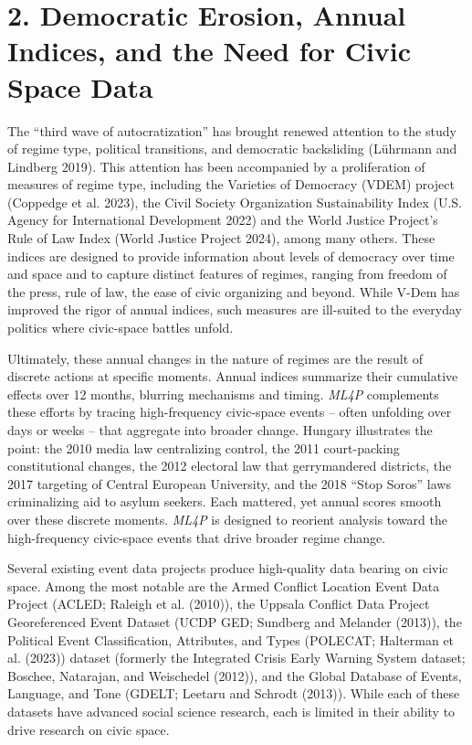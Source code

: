 \documentclass[
  letterpaper,
  DIV=11,
  numbers=noendperiod]{scrartcl}
\begin{document}
\hypertarget{sec-background}{%
\section{2. Democratic Erosion, Annual Indices, and the Need for Civic
Space Data}\label{sec-background}}

The ``third wave of autocratization'' has brought renewed attention to
the study of regime type, political transitions, and democratic
backsliding (Lührmann and Lindberg 2019). This attention has been
accompanied by a proliferation of measures of regime type, including the
Varieties of Democracy (VDEM) project (Coppedge et al. 2023), the Civil
Society Organization Sustainability Index (U.S. Agency for International
Development 2022) and the World Justice Project's Rule of Law Index
(World Justice Project 2024), among many others. These indices are
designed to provide information about levels of democracy over time and
space and to capture distinct features of regimes, ranging from freedom
of the press, rule of law, the ease of civic organizing and beyond.
While V-Dem has improved the rigor of annual indices, such measures are
ill-suited to the everyday politics where civic-space battles unfold.

Ultimately, these annual changes in the nature of regimes are the result
of discrete actions at specific moments. Annual indices summarize their
cumulative effects over 12 months, blurring mechanisms and timing.
\emph{ML4P} complements these efforts by tracing high-frequency
civic-space events -- often unfolding over days or weeks -- that
aggregate into broader change. Hungary illustrates the point: the 2010
media law centralizing control, the 2011 court-packing constitutional
changes, the 2012 electoral law that gerrymandered districts, the 2017
targeting of Central European University, and the 2018 ``Stop Soros''
laws criminalizing aid to asylum seekers. Each mattered, yet annual
scores smooth over these discrete moments. \emph{ML4P} is designed to
reorient analysis toward the high-frequency civic-space events that
drive broader regime change.

Several existing event data projects produce high-quality data bearing
on civic space. Among the most notable are the Armed Conflict Location
Event Data Project (ACLED; Raleigh et al. (2010)), the Uppsala Conflict
Data Project Georeferenced Event Dataset (UCDP GED; Sundberg and
Melander (2013)), the Political Event Classification, Attributes, and
Types (POLECAT; Halterman et al. (2023)) dataset (formerly the
Integrated Crisis Early Warning System dataset; Boschee, Natarajan, and
Weischedel (2012)), and the Global Database of Events, Language, and
Tone (GDELT; Leetaru and Schrodt (2013)). While each of these datasets
have advanced social science research, each is limited in their ability
to drive research on civic space.
\end{document}
